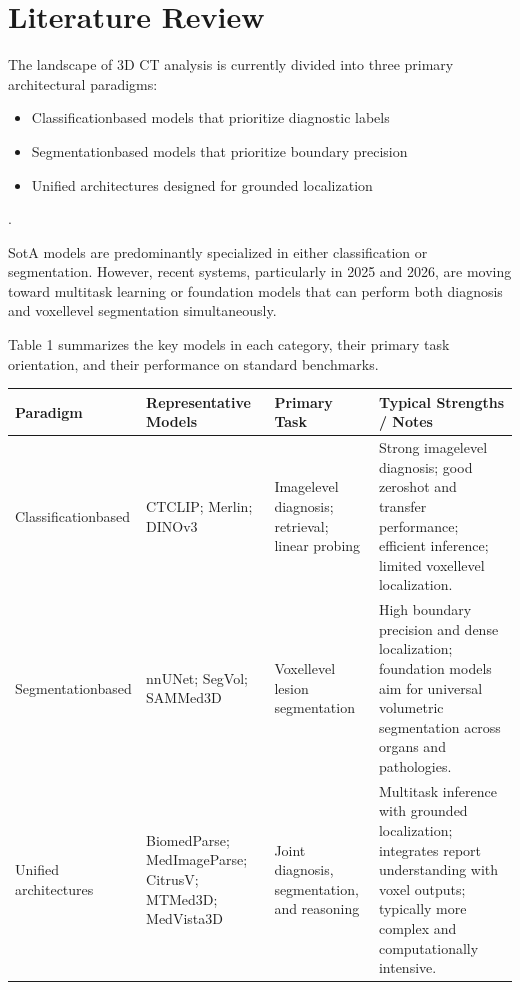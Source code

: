 \section{Literature Review}
The landscape of 3D CT analysis is currently divided into three primary architectural paradigms:
\begin{itemize}
	\item Classificationbased models that prioritize diagnostic labels
	\item Segmentationbased models that prioritize boundary precision
	\item Unified architectures designed for grounded localization
\end{itemize}.

SotA models are predominantly specialized in either classification or segmentation. However, recent systems, particularly
in 2025 and 2026, are moving toward multitask learning or foundation models that can perform both diagnosis and voxellevel
segmentation simultaneously.

Table 1 summarizes the key models in each category, their primary task orientation, and their performance on standard benchmarks.

\begin{center}
\label{tab:3dctparadigms}
\begin{tabularx}{\textwidth}{p{2.8cm} >{\raggedright\arraybackslash}X >{\raggedright\arraybackslash}X >{\raggedright\arraybackslash}X}
\toprule
\textbf{Paradigm} & \textbf{Representative Models} & \textbf{Primary Task} & \textbf{Typical Strengths / Notes} \\
\midrule
Classificationbased & CTCLIP; Merlin; DINOv3 & Imagelevel diagnosis; retrieval; linear probing & Strong imagelevel diagnosis; good zeroshot and transfer performance; efficient inference; limited voxellevel localization. \\
\addlinespace
Segmentationbased & nnUNet; SegVol; SAMMed3D & Voxellevel lesion segmentation & High boundary precision and dense localization; foundation models aim for universal volumetric segmentation across organs and pathologies. \\
\addlinespace
Unified architectures & BiomedParse; MedImageParse; CitrusV; MTMed3D; MedVista3D & Joint diagnosis, segmentation, and reasoning & Multitask inference with grounded localization; integrates report understanding with voxel outputs; typically more complex and computationally intensive. \\
\midrule
\end{tabularx}
\end{center}

